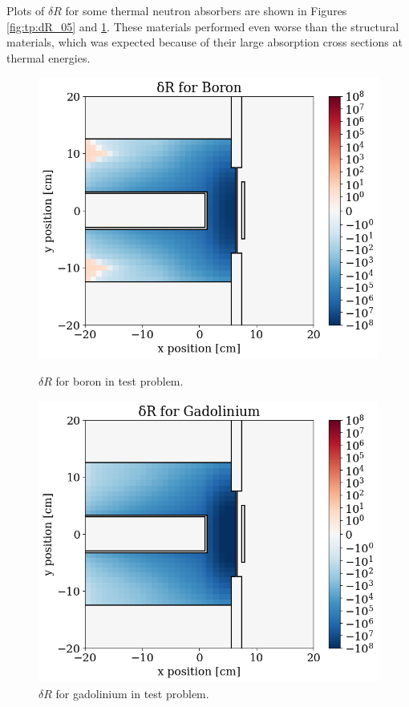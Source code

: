 Plots of $\delta R$ for some thermal neutron absorbers are shown in Figures \ref{fig:tp:dR_05} and \ref{fig:tp:dR_09}.
These materials performed even worse than the structural materials, which was expected because of their large absorption cross sections at thermal energies.

\begin{figure}
  \begin{minipage}{0.495\linewidth}
    \centering
    \includegraphics[width=\linewidth]{content/testprob/dR_05.png}
    \caption{$\delta R$ for boron in test problem.}
    \label{fig:tp:dR_05}
  \end{minipage}
  \hfill
  \begin{minipage}{0.495\linewidth}
    \centering
    \includegraphics[width=\linewidth]{content/testprob/dR_09.png}
    \caption{$\delta R$ for gadolinium in test problem.}
    \label{fig:tp:dR_09}
  \end{minipage}
\end{figure}

